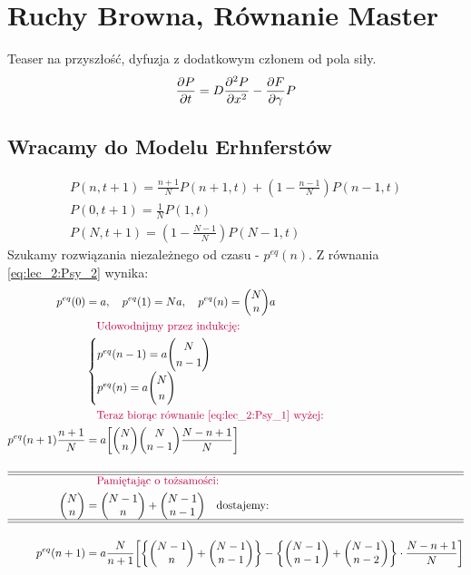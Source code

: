 \documentclass[12pt,a4paper]{report}
\newenvironment{lecture}[1]{\par\medskip
   \noindent\chapter{#1} \rmfamily}{\medskip}
\begin{document}
\begin{lecture}{Ruchy Browna, Równanie Master}
Teaser na przyszłość, dyfuzja z dodatkowym członem od pola siły.
\begin{equation}
    \pdv{P}{t} = D \pdv[2]{P}{x} - \pdv{F}{\gamma}P
    \label{eq:lec_2:dyfuzja_pelna}
\end{equation}

\FloatBarrier

\section{Wracamy do Modelu Erhnferstów}

\begin{align}
    P(n, t+1) = \frac{n+1}{N} P(n+1, t)+ (1 - \frac{n-1}{N}) P(n-1, t) \label{eq:lec_2:Psy_1}\\
    P(0, t+1) = \frac1N P(1, t)\label{eq:lec_2:Psy_2}\\
    P(N, t+1) = (1 - \frac{N - 1}{N}) P( N-1, t)\label{eq:lec_2:Psy_3}
\end{align}
Szukamy rozwiązania niezależnego od czasu - $p^{eq}(n)$. Z równania \ref{eq:lec_2:Psy_2} wynika:
\begin{align*}
    p^{eq}(0) &= a\qc p^{eq}(1) = Na\qc p^{eq}(n) = \mqty(N \\ n)a\\
    &\qq{\color{purple} Udowodnijmy przez indukcję:}\\
    &\begin{cases}
        p^{eq}(n-1) = a \mqty(N \\ n-1)\\
        p^{eq}(n) = a \mqty(N \\n)
    \end{cases}\\
    &\qq{\color{purple} Teraz biorąc równanie \ref{eq:lec_2:Psy_1} wyżej:}\\
    p^{eq}(n+1) \frac{n+1}{N} &= a \qty[\mqty(N \\ n) \mqty(N \\ n-1) \frac{N - n +1}{N}]\\ \\ \hline \hline
    &\qq{\color{purple}Pamiętając o tożsamości:}\\
    \mqty(N \\n) &= \mqty(N-1 \\ n) + \mqty(N-1 \\ n-1)\qq{dostajemy:}\\ \hline \hline \\
    p^{eq}(n+1) &= a \frac{N}{n +1}\qty[\qty{\mqty(N-1\\n) + \mqty(N-1 \\ n-1)} - \qty{\mqty(N-1 \\ n-1) + \mqty(N -1 \\ n-2)} \cdot \frac{N - n + 1}{N}]\\

\end{align*}
\end{lecture}
\end{document}
